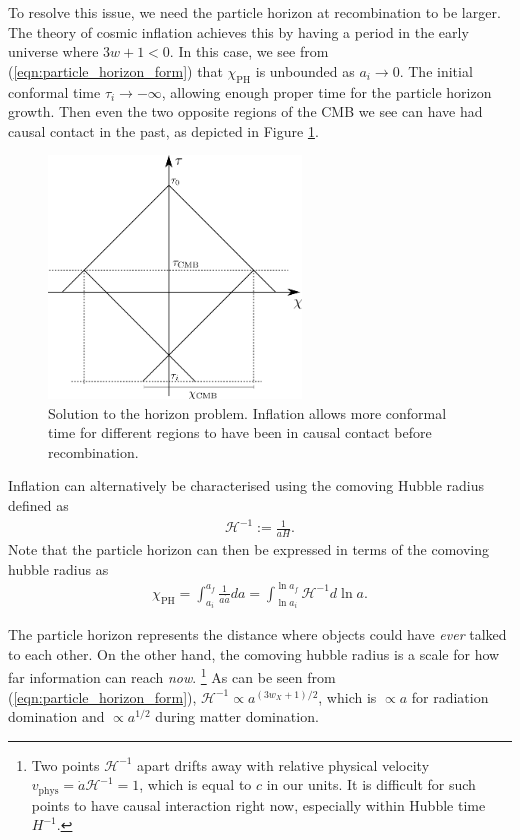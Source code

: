 To resolve this issue, we need the particle horizon at recombination to be larger. The theory of cosmic inflation achieves this by having a period in the early universe where $3w+1<0$. In this case, we see from (\ref{eqn:particle_horizon_form}) that $\chi_\text{PH}$ is unbounded as $a_i \rightarrow 0$. The initial conformal time $\tau_i \rightarrow -\infty$, allowing enough proper time for the particle horizon growth. Then even the two opposite regions of the CMB we see can have had causal contact in the past, as depicted in Figure \ref{fig:horizon_solution}.
\begin{figure}[htbp!] 
	\centering    
	\includegraphics[width=0.6\textwidth]{horizon_solution.png}
	\caption{Solution to the horizon problem. Inflation allows more conformal time for different regions to have been in causal contact before recombination.}
	\label{fig:horizon_solution}
\end{figure}

Inflation can alternatively be characterised using the comoving Hubble radius defined as
\begin{align}
	\mathcal{H}^{-1} := \frac{1}{aH}.
\end{align}
Note that the particle horizon can then be expressed in terms of the comoving hubble radius as
\begin{align}
	\chi_\text{PH} = \int_{a_i}^{a_f} \frac{1}{a \dot{a}} da = \int_{\ln a_i}^{\ln a_f} \mathcal{H}^{-1} d\ln a. \label{eqn:particle_horizon_comoving_hubble}
\end{align}

The particle horizon represents the distance where objects could have \textit{ever} talked to each other. On the other hand, the comoving hubble radius is a scale for how far information can reach \textit{now}. \footnote{Two points $\mathcal{H}^{-1}$ apart drifts away with relative physical velocity $v_\text{phys} = \dot{a} \mathcal{H}^{-1} = 1$, which is equal to $c$ in our units. It is difficult for such points to have causal interaction right now, especially within Hubble time $H^{-1}$.} As can be seen from (\ref{eqn:particle_horizon_form}), $\mathcal{H}^{-1} \propto a^{(3w_X+1)/2}$, which is $\propto a$ for radiation domination and $\propto a^{1/2}$ during matter domination.

